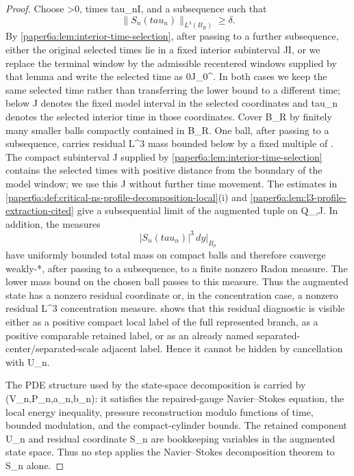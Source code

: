 \documentclass[11pt]{amsart}
\def\({}%
\def\){}%
\def\tau{tau}%
\theoremstyle{plain}
\theoremstyle{definition}
\theoremstyle{remark}
\begin{document}
\begin{proof}
Choose \(\delta>0\), times \(\tau_n\in I\), and a subsequence such that
\[
  \|S_n(\tau_n)\|_{L^3(B_R)}\ge\delta .
\]
By \cref{paper6a:lem:interior-time-selection}, after passing to a further
subsequence, either the original selected times lie in a fixed interior
subinterval \(J\Subset I\), or we replace the terminal window by the
admissible recentered windows supplied by that lemma and write the selected
time as \(0\in J_0^\circ\).  In both cases we keep the same selected time
rather than transferring the lower bound to a different time; below \(J\)
denotes the fixed model interval in the selected coordinates and \(\tau_n\)
denotes the selected interior time in those coordinates.
Cover \(B_R\) by finitely many smaller balls compactly contained in \(B_R\).
One ball, after passing to a subsequence, carries residual \(L^3\) mass bounded
below by a fixed multiple of \(\delta\).  The compact subinterval
\(J\) supplied by \cref{paper6a:lem:interior-time-selection}
contains the selected times with positive distance from the boundary of the
model window; we use this \(J\) without further time movement.  The estimates in
\cref{paper6a:def:critical-ns-profile-decomposition-local}\textup{(i)} and
\cref{paper6a:lem:l3-profile-extraction-cited} give a subsequential limit of
the augmented tuple on \(Q_{\rho,J}\).  In addition, the measures
\[
  |S_n(\tau_n)|^3\,dy\big|_{B_\rho}
\]
have uniformly bounded total mass on compact balls and therefore converge
weakly-\(*\), after passing to a subsequence, to a finite nonzero Radon measure.
The lower mass bound on the chosen ball passes to this measure.  Thus the
augmented state has a nonzero residual coordinate or, in the concentration
case, a nonzero residual \(L^3\) concentration measure.
 shows that this residual
diagnostic is visible either as a positive compact local label of the full
represented branch, as a positive comparable retained label, or as an already
named separated-center/separated-scale adjacent label.  Hence it cannot be
hidden by cancellation with \(U_n\).

The PDE structure used by the state-space decomposition is carried by
\((V_n,P_n,a_n,b_n)\): it satisfies the repaired-gauge Navier--Stokes equation,
the local energy inequality, pressure reconstruction modulo functions of time,
bounded modulation, and the compact-cylinder bounds.  The retained component
\(U_n\) and residual coordinate \(S_n\) are bookkeeping variables in the
augmented state space.  Thus no step applies the Navier--Stokes decomposition
theorem to \(S_n\) alone.


\end{proof}
\end{document}
